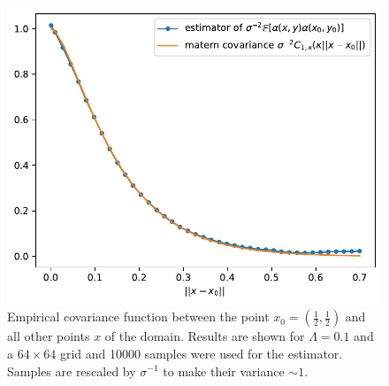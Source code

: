 \documentclass[11pt]{article}
\begin{document}
\begin{figure}
    \begin{center}
    \includegraphics[width=0.8\linewidth]{figures/covariance_2d.pdf}
    \caption{Empirical covariance function between the point $x_0=(\frac{1}{2},\frac{1}{2})$ and all other points $x$ of the domain. Results are shown for $\Lambda=0.1$ and a $64\times 64$ grid and 10000 samples were used for the estimator. Samples are rescaled by $\sigma^{-1}$ to make their variance $\sim 1$.}
    \label{fig:empirical_covariance_2d}
    \end{center}
    \end{figure}
    


\end{document}
